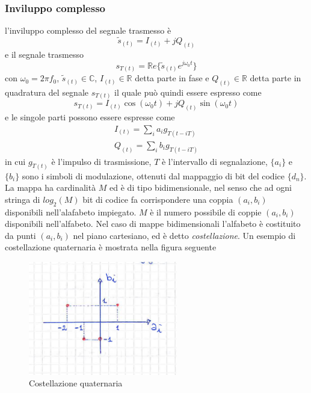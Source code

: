         \subsubsection{Inviluppo complesso}
            l'inviluppo complesso del segnale trasmesso è 
            \[
                \tilde{s}_{(t)} = I_{(t)} +j Q_{(t)}      
            \]
            e il segnale trasmesso
            \[
                  s_{T(t)} = \mathbb{R}e\{\tilde{s}_{(t)}e^{j\omega_0t}\}
            \]
            con $\omega_0 = 2\pi f_0$, $\tilde{s}_{(t)}\in \mathbb{C}$, $I_{(t)}\in \mathbb{R}$ detta parte in fase e 
            $Q_{(t)}\in \mathbb{R}$ detta parte in quadratura del segnale $s_{T(t)}$ il quale può quindi essere espresso 
            come 
            \[
                s_{T(t)} =I_{(t)}\cos(\omega_0t)+jQ_{(t)}\sin(\omega_0t)  
            \]  
            e le singole parti possono essere espresse come 
            \begin{gather}
                I_{(t)} = \sum_{i}a_ig_{T(t-iT)}\nonumber \\
                Q_{(t)} = \sum_{i}b_ig_{T(t-iT)}\nonumber
            \end{gather}
            in cui $g_{T(t)}$ è l'impulso di trasmissione, $T$ è l'intervallo di segnalazione,
            $\{a_i\}$ e $\{b_i\}$ sono i simboli di modulazione, ottenuti dal mappaggio di bit del codice $\{d_n\}$.
            La mappa ha cardinalità $M$ ed è di tipo bidimensionale, nel senso che ad ogni stringa di $log_2(M)$ bit di codice
            fa corrispondere una coppia $(a_i,b_i)$ disponibili nell'alafabeto impiegato. $M$ è il numero possibile di coppie $(a_i,b_i)$ 
            disponibili nell'alfabeto. Nel caso di mappe bidimensionali l'alfabeto è costituito da punti $(a_i,b_i)$ nel piano cartesiano,
            ed è detto \emph{costellazione}. Un esempio di costellazione quaternaria è mostrata nella figura seguente
            \begin{figure}[H]
                \centering
                \includegraphics[width = 6.5cm]{media/costellazione quaternaria.png}
                \caption{Costellazione quaternaria}
            \end{figure}
